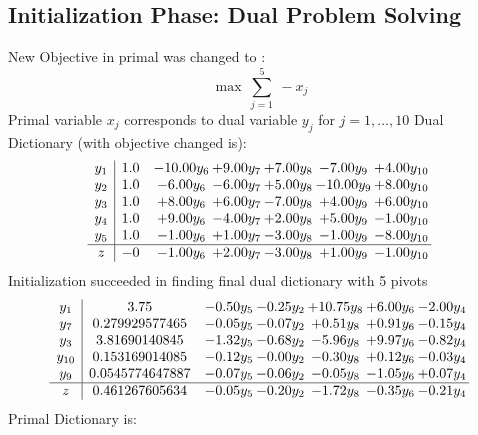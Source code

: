 \documentclass[8pt]{article}
\begin{document}
\subsection{Initialization Phase: Dual Problem Solving}
New Objective in primal was changed to : \[ \max\ \sum_{j=1}^{5}\ - x_j \] 
Primal variable $x_j$ corresponds to dual variable $y_j$ for $j = 1,\ldots,10$
Dual Dictionary (with objective changed is): 
\[\begin{array}{c| c c@{\hskip 2pt} c@{\hskip 2pt} c@{\hskip 2pt} c@{\hskip 2pt} c@{\hskip 2pt} }
 y_{1}   &  1.0 & -10.00 y_{6} & +  9.00 y_{7} & +  7.00 y_{8} & -7.00 y_{9} & +  4.00 y_{10}\\
 y_{2}   &  1.0 & -6.00 y_{6} & -6.00 y_{7} & +  5.00 y_{8} & -10.00 y_{9} & +  8.00 y_{10}\\
 y_{3}   &  1.0 & +  8.00 y_{6} & +  6.00 y_{7} & -7.00 y_{8} & +  4.00 y_{9} & +  6.00 y_{10}\\
 y_{4}   &  1.0 & +  9.00 y_{6} & -4.00 y_{7} & +  2.00 y_{8} & +  5.00 y_{9} & -1.00 y_{10}\\
 y_{5}   &  1.0 & -1.00 y_{6} & +  1.00 y_{7} & -3.00 y_{8} & -1.00 y_{9} & -8.00 y_{10}\\
\hline
z    &  -0 & -1.00 y_{6} & +  2.00 y_{7} & -3.00 y_{8} & +  1.00 y_{9} & -1.00 y_{10}\\
\end{array}\]
Initialization succeeded in finding final dual dictionary with 5 pivots
\[\begin{array}{c| c c@{\hskip 2pt} c@{\hskip 2pt} c@{\hskip 2pt} c@{\hskip 2pt} c@{\hskip 2pt} }
 y_{1}   &  3.75 & -0.50 y_{5} & -0.25 y_{2} & + 10.75 y_{8} & +  6.00 y_{6} & -2.00 y_{4}\\
 y_{7}   &  0.279929577465 & -0.05 y_{5} & -0.07 y_{2} & +  0.51 y_{8} & +  0.91 y_{6} & -0.15 y_{4}\\
 y_{3}   &  3.81690140845 & -1.32 y_{5} & -0.68 y_{2} & -5.96 y_{8} & +  9.97 y_{6} & -0.82 y_{4}\\
 y_{10}   &  0.153169014085 & -0.12 y_{5} & -0.00 y_{2} & -0.30 y_{8} & +  0.12 y_{6} & -0.03 y_{4}\\
 y_{9}   &  0.0545774647887 & -0.07 y_{5} & -0.06 y_{2} & -0.05 y_{8} & -1.05 y_{6} & +  0.07 y_{4}\\
\hline
z    &  0.461267605634 & -0.05 y_{5} & -0.20 y_{2} & -1.72 y_{8} & -0.35 y_{6} & -0.21 y_{4}\\
\end{array}\]
Primal Dictionary is:
\end{document}
